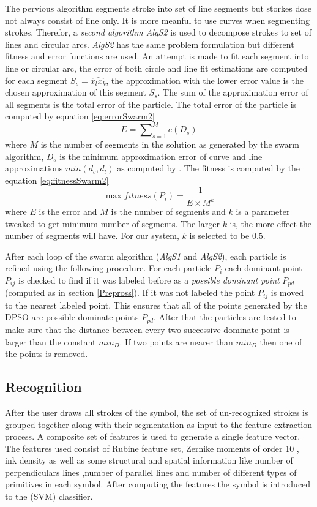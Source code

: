 \documentclass{article}
\begin{document}
The pervious algorithm segments stroke into set of line segments but storkes dose not always consist of line only. It is more meanful to use curves when segmenting strokes. Therefor, a \textit{second algorithm \textsl{AlgS2}} is used to decompose strokes to set of lines and circular arcs. \textit{\textsl{AlgS2}} has the same problem formulation but different fitness and error functions are used. An attempt is made to fit each segment into line or circular arc, the error of both circle and line fit estimations are computed for each segment $S_s=\widehat{x_lx_k}$, the approximation with the lower error value is the chosen approximation of this segment $S_s$\cite{CruveDivisionSwarm}. The sum of the approximation error of all segments is the total error of the particle. The total error of the particle is computed by equation \ref{eq:errorSwarm2}
 \begin{equation}
E=\sum\nolimits_{s = 1}^M e(D_s) 
\label{eq:errorSwarm2}
\end{equation}where $M$ is the number of segments in the solution as generated by the swarm algorithm, $D_s$ is the minimum approximation error of curve and line approximations $min(d_c,d_l)$ as computed by \cite{CruveDivisionSwarm}.  The fitness is computed by the equation \ref{eq:fitnessSwarm2} \begin{equation}
\max fitness(P_i ) = \frac{1}{{E \times M^k }}
\label{eq:fitnessSwarm2}
\end{equation} where $E$ is the error and $M$ is the number of segments and $k$ is a parameter tweaked to get minimum number of segments. The larger $k$ is, the more effect the number of segments will have. For our system, $k$ is selected to be $0.5$\cite{CruveDivisionSwarm}.

After each loop of the swarm algorithm (\textsl{AlgS1} and \textsl{AlgS2}), each particle is refined using the following procedure. For each particle $P_i$ each dominant point $P_{ij}$ is checked to find if it was labeled before as a \textit{possible dominant point} $P_{pd}$ (computed as in section \ref{Prepross}). If it was not labeled the point $P_{ij}$ is moved to the nearest labeled point. This ensures that all of the points generated by the DPSO are possible dominate points $P_{pd}$. After that the particles are tested to make sure that the distance between every two successive dominate point is larger than the constant $min_D$. If two points are nearer than $min_D$ then one of the points is removed. 
\subsection{Recognition}
\label{sec:Recognition}
After the user draws all strokes of the symbol, the set of un-recognized strokes is grouped together along with their segmentation as input to the feature extraction process. A composite set of features is used to generate a single feature vector. The features used consist of Rubine feature set,  Zernike moments of order 10 \cite{HeloiseBeautification}, ink density as well as some structural and spatial information like number of perpendiculars lines ,number of parallel lines and number of different types of primitives in each symbol. After computing the features the symbol is introduced to the (SVM) classifier. 
\end{document}
